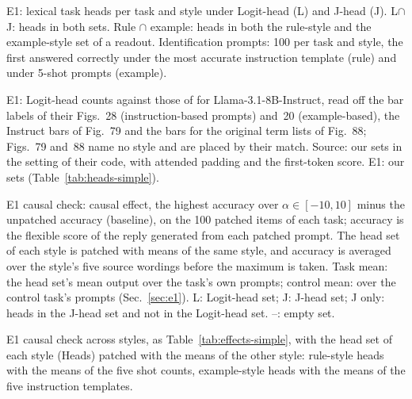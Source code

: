 \documentclass[11pt,a4paper]{article}
\begin{document}
\begin{table}[H]
\centering\footnotesize

\caption{E1: lexical task heads per task and style under Logit-head (L) and J-head (J). L$\cap$J: heads in both sets. Rule $\cap$ example: heads in both the rule-style and the example-style set of a readout. Identification prompts: 100 per task and style, the first answered correctly under the most accurate instruction template (rule) and under 5-shot prompts (example).}
\label{tab:heads-simple}
\end{table}

\begin{table}[H]
\centering\footnotesize

\caption{E1: Logit-head counts against those of \citet{yang2026shared} for Llama-3.1-8B-Instruct, read off the bar labels of their Figs.~28 (instruction-based prompts) and~20 (example-based), the Instruct bars of Fig.~79 and the bars for the original term lists of Fig.~88; Figs.~79 and~88 name no style and are placed by their match. Source: our sets in the setting of their code, with attended padding and the first-token score. E1: our sets (Table~\ref{tab:heads-simple}).}
\label{tab:counts-yang}
\end{table}

\begin{table}[H]
\centering\footnotesize

\caption{E1 causal check: causal effect, the highest accuracy over $\alpha\in[-10,10]$ minus the unpatched accuracy (baseline), on the 100 patched items of each task; accuracy is the flexible score of the reply generated from each patched prompt. The head set of each style is patched with means of the same style, and accuracy is averaged over the style's five source wordings before the maximum is taken. Task mean: the head set's mean output over the task's own prompts; control mean: over the control task's prompts (Sec.~\ref{sec:e1}). L: Logit-head set; J: J-head set; J only: heads in the J-head set and not in the Logit-head set. --: empty set.}
\label{tab:effects-simple}
\end{table}

\begin{table}[H]
\centering\footnotesize

\caption{E1 causal check across styles, as Table~\ref{tab:effects-simple}, with the head set of each style (Heads) patched with the means of the other style: rule-style heads with the means of the five shot counts, example-style heads with the means of the five instruction templates.}
\label{tab:effects-simple-cross}
\end{table}
\end{document}

